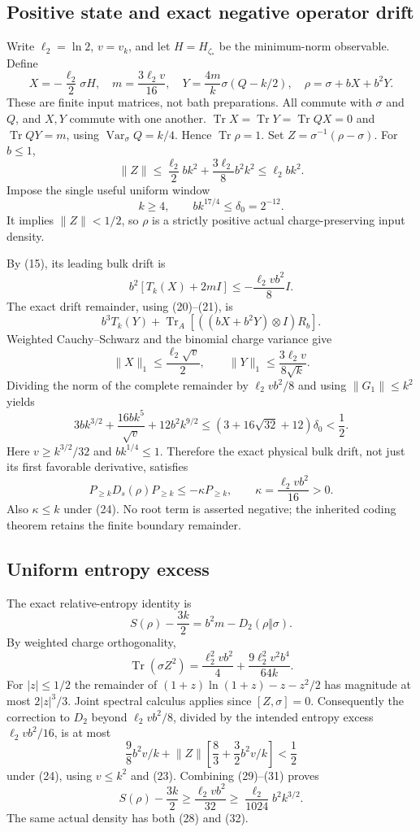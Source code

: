 \documentclass[11pt]{article}
\newcommand{\Tr}{\operatorname{Tr}}
\newcommand{\norm}[1]{\lVert #1\rVert}
\newcommand{\ellog}{\ell_2}
\begin{document}
\subsection{Positive state and exact negative operator drift}

Write $\ellog=\ln2$, $v=v_k$, and let $H=H_{\zeta_*}$ be the
minimum-norm observable. Define
\[
 X=-\frac{\ellog}{2}\sigma H,\quad
 m=\frac{3\ellog v}{16},\quad
 Y=\frac{4m}{k}\sigma(Q-k/2),\quad
 \rho=\sigma+bX+b^2Y.
 \tag{22}
\]
These are finite input matrices, not bath preparations. All commute
with $\sigma$ and $Q$, and $X,Y$ commute with one another.
$\Tr X=\Tr Y=\Tr QX=0$ and $\Tr QY=m$, using
$\operatorname{Var}_\sigma Q=k/4$. Hence $\Tr\rho=1$.
Set $Z=\sigma^{-1}(\rho-\sigma)$. For $b\le1$,
\[
 \norm Z\le\frac{\ellog}{2}bk^2+
                   \frac{3\ellog}{8}b^2k^2\le\ellog bk^2.
 \tag{23}
\]
Impose the single useful uniform window
\[
 k\ge4,\qquad b k^{17/4}\le\delta_0=2^{-12}.
 \tag{24}
\]
It implies $\norm Z<1/2$, so $\rho$ is a strictly positive actual
charge-preserving input density.

By (15), its leading bulk drift is
\[
 b^2[T_k(X)+2mI]\le-\frac{\ellog v b^2}{8}I.
 \tag{25}
\]
The exact drift remainder, using (20)--(21), is
\[
 b^3T_k(Y)+\Tr_A[((bX+b^2Y)\otimes I)R_b].
\]
Weighted Cauchy--Schwarz and the binomial charge variance give
\[
 \norm X_1\le\frac{\ellog\sqrt v}{2},\qquad
 \norm Y_1\le\frac{3\ellog v}{8\sqrt k}.
 \tag{26}
\]
Dividing the norm of the complete remainder by $\ellog v b^2/8$
and using $\norm{G_1}\le k^2$ yields
\[
 3bk^{3/2}+\frac{16bk^5}{\sqrt v}+12b^2k^{9/2}
 \le(3+16\sqrt{32}+12)\delta_0<\frac12.
 \tag{27}
\]
Here $v\ge k^{3/2}/32$ and $bk^{1/4}\le1$. Therefore the exact
physical bulk drift, not just its first favorable derivative, satisfies
\[
 P_{\ge k}D_s(\rho)P_{\ge k}\le-\kappa P_{\ge k},
 \qquad \kappa=\frac{\ellog v b^2}{16}>0.
 \tag{28}
\]
Also $\kappa\le k$ under (24). No root term is asserted negative;
the inherited coding theorem retains the finite boundary remainder.

\subsection{Uniform entropy excess}

The exact relative-entropy identity is
\[
 S(\rho)-\frac{3k}{2}=b^2m-D_2(\rho\Vert\sigma).
 \tag{29}
\]
By weighted charge orthogonality,
\[
 \Tr(\sigma Z^2)=\frac{\ellog^2v b^2}{4}
                    +\frac{9\ellog^2v^2b^4}{64k}.
 \tag{30}
\]
For $|z|\le1/2$ the remainder of
$(1+z)\ln(1+z)-z-z^2/2$ has magnitude at most $2|z|^3/3$.
Joint spectral calculus applies since $[Z,\sigma]=0$. Consequently
the correction to $D_2$ beyond $\ellog v b^2/8$, divided by the
intended entropy excess $\ellog v b^2/16$, is at most
\[
 \frac98 b^2v/k+\norm Z\left[\frac83+\frac32b^2v/k\right]
 <\frac12
 \tag{31}
\]
under (24), using $v\le k^2$ and (23). Combining (29)--(31) proves
\[
 S(\rho)-\frac{3k}{2}
 \ge\frac{\ellog v b^2}{32}
 \ge\frac{\ellog}{1024}b^2k^{3/2}.
 \tag{32}
\]
The same actual density has both (28) and (32).
\end{document}
